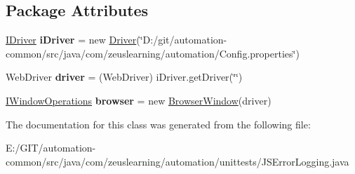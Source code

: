 \subsection*{Package Attributes}
\begin{DoxyCompactItemize}
\item 
\hypertarget{classcom_1_1zeuslearning_1_1automation_1_1unittests_1_1JSErrorLogging_a08c3fb0bf62e16b813f24e766c6ada40}{}\label{classcom_1_1zeuslearning_1_1automation_1_1unittests_1_1JSErrorLogging_a08c3fb0bf62e16b813f24e766c6ada40} 
\hyperlink{interfacecom_1_1zeuslearning_1_1automation_1_1driver_1_1IDriver}{I\+Driver} {\bfseries i\+Driver} = new \hyperlink{classcom_1_1zeuslearning_1_1automation_1_1selenium_1_1driver_1_1Driver}{Driver}(\char`\"{}D\+:/git/automation-\/common/src/java/com/zeuslearning/automation/Config.\+properties\char`\"{})
\item 
\hypertarget{classcom_1_1zeuslearning_1_1automation_1_1unittests_1_1JSErrorLogging_a8c8df46322289bb2dc73cd61b2912b51}{}\label{classcom_1_1zeuslearning_1_1automation_1_1unittests_1_1JSErrorLogging_a8c8df46322289bb2dc73cd61b2912b51} 
Web\+Driver {\bfseries driver} = (Web\+Driver) i\+Driver.\+get\+Driver(\char`\"{}\char`\"{})
\item 
\hypertarget{classcom_1_1zeuslearning_1_1automation_1_1unittests_1_1JSErrorLogging_a4ddc72aa8c5fa4ba77860c4b6a0ed427}{}\label{classcom_1_1zeuslearning_1_1automation_1_1unittests_1_1JSErrorLogging_a4ddc72aa8c5fa4ba77860c4b6a0ed427} 
\hyperlink{interfacecom_1_1zeuslearning_1_1automation_1_1interactions_1_1IWindowOperations}{I\+Window\+Operations} {\bfseries browser} = new \hyperlink{classcom_1_1zeuslearning_1_1automation_1_1selenium_1_1interactions_1_1BrowserWindow}{Browser\+Window}(driver)
\end{DoxyCompactItemize}


The documentation for this class was generated from the following file\+:\begin{DoxyCompactItemize}
\item 
E\+:/\+G\+I\+T/automation-\/common/src/java/com/zeuslearning/automation/unittests/J\+S\+Error\+Logging.\+java\end{DoxyCompactItemize}
